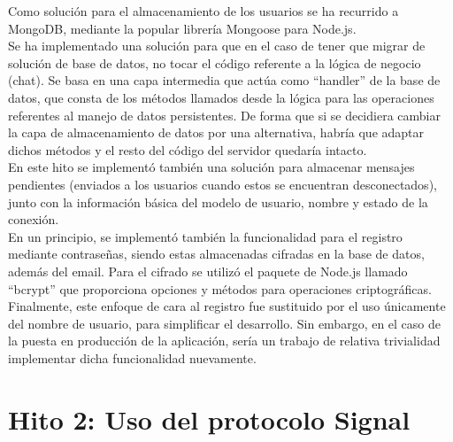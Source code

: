 Como solución para el almacenamiento de los usuarios se ha recurrido a MongoDB, mediante la popular librería Mongoose para Node.js. \\

Se ha implementado una solución para que en el caso de tener que migrar de solución de base de datos, no tocar el código referente a la lógica de negocio (chat). Se basa en una capa intermedia que actúa como \hyphenquote{spanish}{handler} de la base de datos, que consta de los métodos llamados desde la lógica para las operaciones referentes al manejo de datos persistentes. De forma que si se decidiera cambiar la capa de almacenamiento de datos por una alternativa, habría que adaptar dichos métodos y el resto del código del servidor quedaría intacto. \\ 

En este hito se implementó también una solución para almacenar mensajes pendientes (enviados a los usuarios cuando estos se encuentran desconectados), junto con la información básica del modelo de usuario, nombre y estado de la conexión. \\

En un principio, se implementó también la funcionalidad para el registro mediante contraseñas, siendo estas almacenadas cifradas en la base de datos, además del email. Para el cifrado se utilizó el paquete de Node.js llamado \hyphenquote{spanish}{bcrypt} que proporciona opciones y métodos para operaciones criptográficas. Finalmente, este enfoque de cara al registro fue sustituido por el uso únicamente del nombre de usuario, para simplificar el desarrollo. Sin embargo, en el caso de la puesta en producción de la aplicación, sería un trabajo de relativa trivialidad implementar dicha funcionalidad nuevamente. \\

\section{Hito 2: Uso del protocolo Signal}
